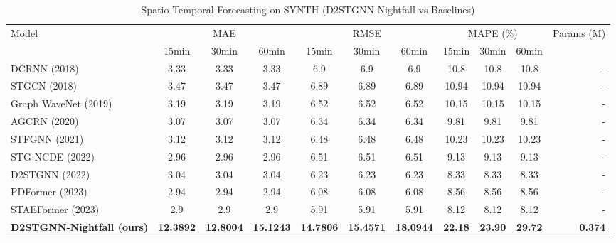 \begin{table}[h]
\centering
\caption{Spatio-Temporal Forecasting on SYNTH (D2STGNN-Nightfall vs Baselines)}
\label{tab:nightfall_comparison}
\begin{tabular}{l|ccc|ccc|ccc|r}
\hline
\multirow{2}{*}{Model} & \multicolumn{3}{c|}{MAE} & \multicolumn{3}{c|}{RMSE} & \multicolumn{3}{c|}{MAPE (\%)} & \multirow{2}{*}{Params (M)} \\
 & 15min & 30min & 60min & 15min & 30min & 60min & 15min & 30min & 60min & \\
\hline
DCRNN (2018) & 3.33 & 3.33 & 3.33 & 6.9 & 6.9 & 6.9 & 10.8 & 10.8 & 10.8 & - \\
STGCN (2018) & 3.47 & 3.47 & 3.47 & 6.89 & 6.89 & 6.89 & 10.94 & 10.94 & 10.94 & - \\
Graph WaveNet (2019) & 3.19 & 3.19 & 3.19 & 6.52 & 6.52 & 6.52 & 10.15 & 10.15 & 10.15 & - \\
AGCRN (2020) & 3.07 & 3.07 & 3.07 & 6.34 & 6.34 & 6.34 & 9.81 & 9.81 & 9.81 & - \\
STFGNN (2021) & 3.12 & 3.12 & 3.12 & 6.48 & 6.48 & 6.48 & 10.23 & 10.23 & 10.23 & - \\
STG-NCDE (2022) & 2.96 & 2.96 & 2.96 & 6.51 & 6.51 & 6.51 & 9.13 & 9.13 & 9.13 & - \\
D2STGNN (2022) & 3.04 & 3.04 & 3.04 & 6.23 & 6.23 & 6.23 & 8.33 & 8.33 & 8.33 & - \\
PDFormer (2023) & 2.94 & 2.94 & 2.94 & 6.08 & 6.08 & 6.08 & 8.56 & 8.56 & 8.56 & - \\
STAEFormer (2023) & 2.9 & 2.9 & 2.9 & 5.91 & 5.91 & 5.91 & 8.12 & 8.12 & 8.12 & - \\
\hline
\textbf{D2STGNN-Nightfall (ours)} & \textbf{12.3892} & \textbf{12.8004} & \textbf{15.1243} & \textbf{14.7806} & \textbf{15.4571} & \textbf{18.0944} & \textbf{22.18} & \textbf{23.90} & \textbf{29.72} & \textbf{0.374} \\
\hline
\end{tabular}
\end{table}
